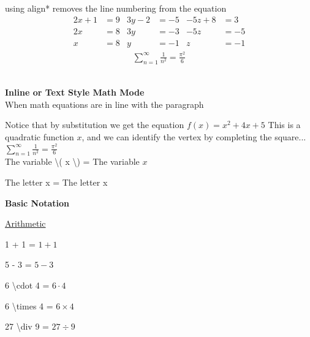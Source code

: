 \documentclass[a4paper, 12pt]{book}
\begin{document}
using align* removes the line numbering from the equation
\begin{align*}
  2x + 1 & = 9  & 3y - 2 & = -5  &  -5z + 8 & = 3 \\
      2x & = 8  &     3y & = -3  &     -5z & = -5 \\
       x & = 8  &      y & = -1  &       z & = -1
\end{align*}
\begin{align*}
  \sum_{n=1}^\infty \frac{1}{n^2} = \frac{\pi^2}{6}
\end{align*}
\\
\begin{center}
  \Large{\textbf{Inline or Text Style Math Mode}} \\
  \normalsize When math equations are in line with the paragraph
\end{center}

Notice that by substitution we get the equation \(f(x) = x^2 + 4x + 5\) This is a quadratic function \( x \), and we can identify the vertex by completing the square...
\\
\( \sum_{n=1}^\infty \frac{1}{n^2} = \frac{\pi^2}{6} \)
\\

The variable \textbackslash( x \textbackslash ) = The variable \( x \)

The letter x = The letter x

\break

\begin{center}
  \Large{\textbf{Basic Notation}}
\end{center}

\underline{Arithmetic}

1 + 1 \-\hspace{0.8cm}=\-\hspace{0.7cm} \( 1 + 1 \)

5 - 3 \-\hspace{1cm}=\-\hspace{0.7cm} \( 5 - 3 \)

6 \textbackslash cdot 4 \-\hspace{0.15cm}=\-\hspace{0.65cm} \( 6 \cdot 4 \)

6 \textbackslash times 4 =\-\hspace{0.65cm} \( 6 \times 4 \)

27 \textbackslash div 9 \-\hspace{0.15cm}=\-\hspace{0.65cm} \( 27 \div 9 \)
\\
\end{document}
